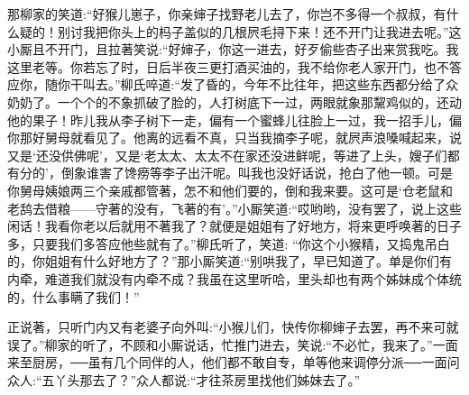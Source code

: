 

\begin{parag}
    那柳家的笑道:“好猴儿崽子，你亲婶子找野老儿去了，你岂不多得一个叔叔，有什么疑的！别讨我把你头上的杩子盖似的几根屄毛挦下来！还不开门让我进去呢。”这小厮且不开门，且拉著笑说:“好婶子，你这一进去，好歹偷些杏子出来赏我吃。我这里老等。你若忘了时，日后半夜三更打酒买油的，我不给你老人家开门，也不答应你，随你干叫去。”柳氏啐道:“发了昏的，今年不比往年，把这些东西都分给了众奶奶了。一个个的不象抓破了脸的，人打树底下一过，两眼就象那黧鸡似的，还动他的果子！昨儿我从李子树下一走，偏有一个蜜蜂儿往脸上一过，我一招手儿，偏你那好舅母就看见了。他离的远看不真，只当我摘李子呢，就屄声浪嗓喊起来，说又是‘还没供佛呢’，又是‘老太太、太太不在家还没进鲜呢，等进了上头，嫂子们都有分的’，倒象谁害了馋痨等李子出汗呢。叫我也没好话说，抢白了他一顿。可是你舅母姨娘两三个亲戚都管著，怎不和他们要的，倒和我来要。这可是‘仓老鼠和老鸹去借粮——守著的没有，飞著的有’。”小厮笑道:“哎哟哟，没有罢了，说上这些闲话！我看你老以后就用不著我了？就便是姐姐有了好地方，将来更呼唤著的日子多，只要我们多答应他些就有了。”柳氏听了，笑道: “你这个小猴精，又捣鬼吊白的，你姐姐有什么好地方了？”那小厮笑道:“别哄我了，早已知道了。单是你们有内牵，难道我们就没有内牵不成？我虽在这里听哈，里头却也有两个姊妹成个体统的，什么事瞒了我们！”
\end{parag}


\begin{parag}
    正说著，只听门内又有老婆子向外叫:“小猴儿们，快传你柳婶子去罢，再不来可就误了。”柳家的听了，不顾和小厮说话，忙推门进去，笑说:“不必忙，我来了。”一面来至厨房，──虽有几个同伴的人，他们都不敢自专，单等他来调停分派──一面问众人:“五丫头那去了？”众人都说:“才往茶房里找他们姊妹去了。”
\end{parag}


